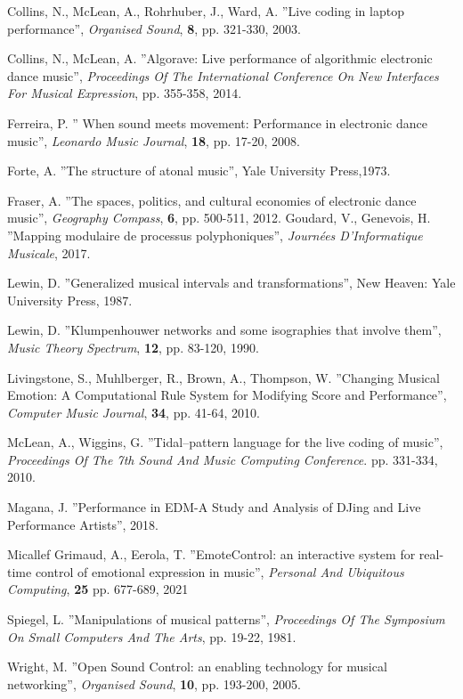 \documentclass{article}
\begin{document}
\begin{thebibliography}{2}
  Collins, N., McLean, A., Rohrhuber, J., Ward, A. ''Live coding in laptop performance'',
  {\em Organised Sound}, \textbf{8}, pp. 321-330, 2003.

  Collins, N., McLean, A. 
  ''Algorave: Live performance of algorithmic electronic dance music'',
  {\em Proceedings Of The International Conference On New Interfaces For Musical Expression}, pp. 355-358, 2014.

  Ferreira, P.
  '' When sound meets movement: Performance in electronic dance music'',
   {\em Leonardo Music Journal}, \textbf{18}, pp. 17-20, 2008.

  Forte, A.
  ''The structure of atonal music'',
  Yale University Press,1973.

  Fraser, A. 
  ''The spaces, politics, and cultural economies of electronic dance music'', {\em Geography Compass}, \textbf{6}, pp. 500-511, 2012.
  Goudard, V., Genevois, H. 
  ''Mapping modulaire de processus polyphoniques'',
  {\em Journées D'Informatique Musicale}, 2017.

  Lewin, D. 
  ''Generalized musical intervals and transformations'', 
  New Heaven: Yale University Press, 1987.

  Lewin, D. 
  ''Klumpenhouwer networks and some isographies that involve them'',
  {\em Music Theory Spectrum}, \textbf{12}, pp. 83-120, 1990.

  Livingstone, S., Muhlberger, R., Brown, A., Thompson, W. 
  ''Changing Musical Emotion: A Computational Rule System for Modifying Score and Performance'', 
  {\em Computer Music Journal}, \textbf{34}, pp. 41-64, 2010.

  McLean, A., Wiggins, G. 
  ''Tidal–pattern language for the live coding of music'',
  {\em Proceedings Of The 7th Sound And Music Computing Conference}. pp. 331-334, 2010.

  Magana, J. 
  ''Performance in EDM-A Study and Analysis of DJing and Live Performance Artists'', 2018.


  Micallef Grimaud, A., Eerola, T.
  ''EmoteControl: an interactive system for real-time control of emotional expression in music'', 
  {\em Personal And Ubiquitous Computing}, \textbf{25} pp. 677-689, 2021

  Spiegel, L. 
  ''Manipulations of musical patterns'',
   {\em Proceedings Of The Symposium On Small Computers And The Arts}, pp. 19-22, 1981.

  Wright, M. 
  ''Open Sound Control: an enabling technology for musical networking'',
  {\em Organised Sound}, \textbf{10}, pp. 193-200, 2005.
  
\end{thebibliography}
\end{document}
